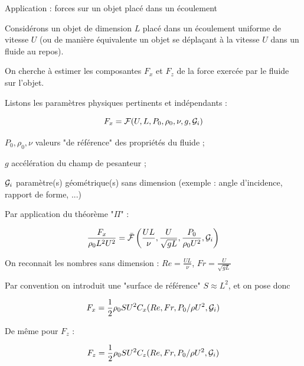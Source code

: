 \begin{frame}{Application : forces sur un objet placé dans un écoulement}  

\small
%
Considérons un objet de dimension $L$ placé dans un écoulement uniforme de vitesse $U$
(ou de manière équivalente un objet se déplaçant à la vitesse $U$ dans un fluide au repos).

\smallskip


On cherche à estimer les composantes $F_x$ et $F_z$ 
de la force exercée par le fluide sur l'objet.

\medskip
\pause

Listons les paramètres physiques pertinents et indépendants :

\medskip
\pause

$$
F_x = {\cal F}( U, L, P_0, \rho_0, \nu, g, {\cal G}_i)
$$

$P_0, \rho_0, \nu$ valeurs "de référence" des propriétés du fluide ;

$g$ accélération du champ de pesanteur ;

${\cal G}_i$ paramètre(s) géométrique(s) sans dimension (exemple : angle d'incidence, rapport de forme, ...)



\medskip
\pause

Par application du théorème "$\Pi$" :

$$
\frac{F_x}{\rho_0 L^2 U^2} = \bar{\cal F} \left( \frac{U L}{\nu}, \frac{U}{\sqrt{gL}} , \frac{P_0}{\rho_0 U^2}, {\cal G}_i \right)
$$


On reconnait les nombres sans dimension : $Re= \frac{U L}{\nu}$, $Fr = \frac{U}{\sqrt{gL}}$

\smallskip
\pause

Par convention on introduit une "surface de référence" $S \approx L^2$, et on pose donc 
 
$$
F_x = \frac{1}{2} \rho_0 S U^2 C_x(Re, Fr, P_0/\rho U^2, {\cal G}_i)
$$

De même pour $F_z$ : 

$$
F_z = \frac{1}{2} \rho_0 S U^2 C_z(Re, Fr, P_0/\rho U^2,{\cal G}_i)
$$

\end{frame}


